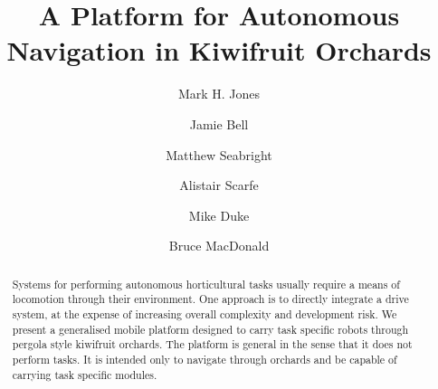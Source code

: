 \documentclass[preprint,authoryear,12pt]{elsarticle}
\begin{document}
\begin{frontmatter}



\title{A Platform for Autonomous Navigation in Kiwifruit Orchards}



\author[UoW]{Mark H. Jones}

\author[UoA]{Jamie Bell}
\author[UoW]{Matthew Seabright}
\author[RPL]{Alistair Scarfe}
\author[UoW]{Mike Duke}
\author[UoA]{Bruce MacDonald}

\address[UoW]{School of Engineering, University of Waikato, Hamilton, New Zealand}
\address[UoA]{Faculty of Engineering, University of Auckland, Auckland, New Zealand}
\address[RPL]{Robotics Plus Ltd, Newnham Innovation Park, Tauranga, New Zealand}

\begin{abstract}
    Systems for performing autonomous horticultural tasks usually require a means of locomotion through their environment.
    One approach is to directly integrate a drive system, at the expense of increasing overall complexity and development risk.
    We present a generalised mobile platform designed to carry task specific robots through pergola style kiwifruit orchards.
    The platform is general in the sense that it does not perform tasks.
    It is intended only to navigate through orchards and be capable of carrying task specific modules.


\end{abstract}
\end{frontmatter}
\end{document}

